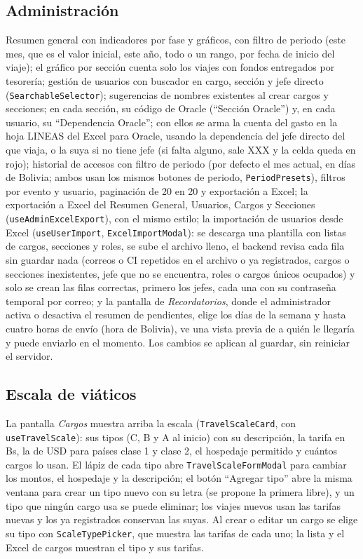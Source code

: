 \documentclass[11pt,letterpaper]{article}
\newcommand{\code}[1]{\nolinkurl{#1}}
\begin{document}
\subsection{Administración}
Resumen general con indicadores por fase y gráficos, con filtro de periodo (este mes, que es el valor inicial, este año, todo o un rango, por fecha de inicio del viaje); el gráfico por sección cuenta solo los viajes con fondos entregados por tesorería; gestión de usuarios con buscador en cargo, sección y jefe directo (\code{SearchableSelector}); sugerencias de nombres existentes al crear cargos y secciones; en cada sección, su código de Oracle (``Sección Oracle'') y, en cada usuario, su ``Dependencia Oracle''; con ellos se arma la cuenta del gasto en la hoja LINEAS del Excel para Oracle, usando la dependencia del jefe directo del que viaja, o la suya si no tiene jefe (si falta alguno, sale XXX y la celda queda en rojo); historial de accesos con filtro de periodo (por defecto el mes actual, en días de Bolivia; ambos usan los mismos botones de periodo, \code{PeriodPresets}), filtros por evento y usuario, paginación de 20 en 20 y exportación a Excel; la exportación a Excel del Resumen General, Usuarios, Cargos y Secciones (\code{useAdminExcelExport}), con el mismo estilo; la importación de usuarios desde Excel (\code{useUserImport}, \code{ExcelImportModal}): se descarga una plantilla con listas de cargos, secciones y roles, se sube el archivo lleno, el backend revisa cada fila sin guardar nada (correos o CI repetidos en el archivo o ya registrados, cargos o secciones inexistentes, jefe que no se encuentra, roles o cargos únicos ocupados) y solo se crean las filas correctas, primero los jefes, cada una con su contraseña temporal por correo; y la pantalla de \emph{Recordatorios}, donde el administrador activa o desactiva el resumen de pendientes, elige los días de la semana y hasta cuatro horas de envío (hora de Bolivia), ve una vista previa de a quién le llegaría y puede enviarlo en el momento. Los cambios se aplican al guardar, sin reiniciar el servidor.

\subsection{Escala de viáticos}
La pantalla \emph{Cargos} muestra arriba la escala (\code{TravelScaleCard}, con \code{useTravelScale}): sus tipos (C, B y A al inicio) con su descripción, la tarifa en Bs, la de USD para países clase 1 y clase 2, el hospedaje permitido y cuántos cargos lo usan. El lápiz de cada tipo abre \code{TravelScaleFormModal} para cambiar los montos, el hospedaje y la descripción; el botón ``Agregar tipo'' abre la misma ventana para crear un tipo nuevo con su letra (se propone la primera libre), y un tipo que ningún cargo usa se puede eliminar; los viajes nuevos usan las tarifas nuevas y los ya registrados conservan las suyas. Al crear o editar un cargo se elige su tipo con \code{ScaleTypePicker}, que muestra las tarifas de cada uno; la lista y el Excel de cargos muestran el tipo y sus tarifas.
\end{document}

